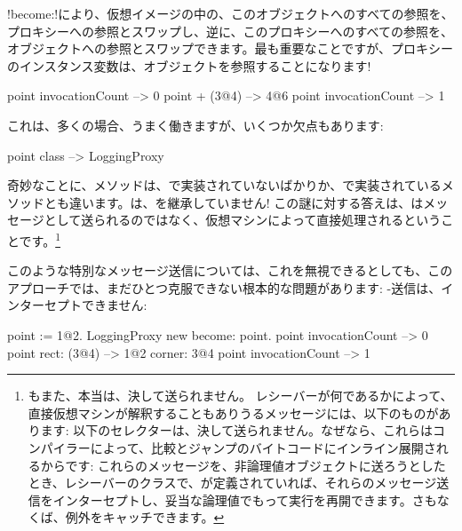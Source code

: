 \documentclass[a4paper,10pt,twoside]{book}
\begin{document}
\ct!become:!により、仮想イメージの中の、このオブジェクトへのすべての参照を、プロキシーへの参照とスワップし、逆に、このプロキシーへのすべての参照を、オブジェクトへの参照とスワップできます。最も重要なことですが、プロキシーのインスタンス変数は、オブジェクトを参照することになります!

\begin{code}{}
point invocationCount --> 0
point + (3@4)             --> 4@6
point invocationCount --> 1
\end{code}

これは、多くの場合、うまく働きますが、いくつか欠点もあります:
\begin{code}{}
point class --> LoggingProxy
\end{code}
奇妙なことに、メソッドは、で実装されていないばかりか、で実装されているメソッドとも違います。は、を継承していません!
この謎に対する答えは、はメッセージとして送られるのではなく、仮想マシンによって直接処理されるということです。\footnote{もまた、本当は、決して送られません。
レシーバーが何であるかによって、直接仮想マシンが解釈することもありうるメッセージには、以下のものがあります:
\ct{+- < > <= >= = ~= * / \ ==}
以下のセレクターは、決して送られません。なぜなら、これらはコンパイラーによって、比較とジャンプのバイトコードにインライン展開されるからです:
これらのメッセージを、非論理値オブジェクトに送ろうとしたとき、レシーバーのクラスで、が定義されていれば、それらのメッセージ送信をインターセプトし、妥当な論理値でもって実行を再開できます。さもなくば、例外をキャッチできます。
}%

このような特別なメッセージ送信については、これを無視できるとしても、このアプローチでは、まだひとつ克服できない根本的な問題があります: \self-送信は、インターセプトできません:
\begin{code}{}
point := 1@2.
LoggingProxy new become: point.
point invocationCount --> 0
point rect: (3@4)        --> 1@2 corner: 3@4
point invocationCount --> 1
\end{code}
\end{document}
